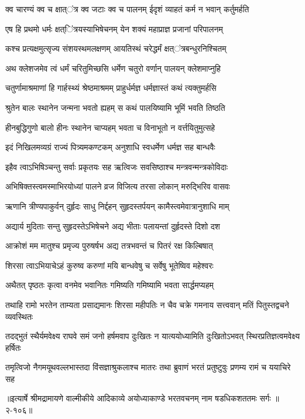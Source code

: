 \twolineshloka
{क्व चारण्यं क्व च क्षात्ऺत्र क्व जटाः क्व च पालनम्}
{ईदृशं व्याहतं कर्म न भवान् कर्तुमर्हति} %

\twolineshloka
{एष हि प्रथमो धर्मः क्षत्ऺित्रयस्याभिषेचनम्}
{येन शक्यं महाप्राज्ञ प्रजानां परिपालनम्} %

\twolineshloka
{कश्च प्रत्यक्षमुत्सृज्य संशयस्थमलक्षणम्}
{आयतिस्थं चरेद्धर्मं क्षत्ऺत्रबन्धुरनिश्चितम्} %

\twolineshloka
{अथ क्लेशजमेव त्वं धर्मं चरितुमिच्छसि}
{धर्मेण चतुरो वर्णान् पालयन् क्लेशमाप्नुहि} %

\twolineshloka
{चतुर्णामाश्रमाणां हि गार्हस्थ्यं श्रेष्ठमाश्रमम्}
{प्राहुर्धर्मज्ञ धर्मज्ञास्तं कथं त्यक्तुमर्हसि} %

\twolineshloka
{श्रुतेन बालः स्थानेन जन्मना भवतो ह्यहम्}
{स कथं पालयिष्यामि भूमिं भवति तिष्ठति} %

\twolineshloka
{हीनबुद्धिगुणो बालो हीनः स्थानेन चाप्यहम्}
{भवता च विनाभूतो न वर्त्तयितुमुत्सहे} %

\twolineshloka
{इदं निखिलमव्यग्रं राज्यं पित्र्यमकण्टकम्}
{अनुशाधि स्वधर्मेण धर्मज्ञ सह बान्धवैः} %

\twolineshloka
{इहैव त्वाऽभिषिञ्चन्तु सर्वाः प्रकृतयः सह}
{ऋत्विजः सवसिष्ठाश्च मन्त्रवन्मन्त्रकोविदाः} %

\twolineshloka
{अभिषिक्तस्त्वमस्माभिरयोध्यां पालने व्रज}
{विजित्य तरसा लोकान् मरुद्भिरिव वासवः} %

\twolineshloka
{ऋणानि त्रीण्यपाकुर्वन् दुर्हृदः साधु निर्द्दहन्}
{सुहृदस्तर्पयन् कामैस्त्वमेवात्रानुशाधि माम्} %

\twolineshloka
{अद्यार्य मुदिताः सन्तु सुहृदस्तेऽभिषेचने}
{अद्य भीताः पलायन्तां दुर्हृदस्ते दिशो दश} %

\twolineshloka
{आक्रोशं मम मातुश्च प्रमृज्य पुरुषर्षभ}
{अद्य तत्रभवन्तं च पितरं रक्ष किल्बिषात्} %

\twolineshloka
{शिरसा त्वाऽभियाचेऽहं कुरुष्व करुणां मयि}
{बान्धवेषु च सर्वेषु भूतेष्विव महेश्वरः} %

\twolineshloka
{अथैतत् पृष्ठतः कृत्वा वनमेव भवानितः}
{गमिष्यति गमिष्यामि भवता सार्द्धमप्यहम्} %

\twolineshloka
{तथाहि रामो भरतेन ताम्यता प्रसाद्यमानः शिरसा महीपतिः}
{न चैव चक्रे गमनाय सत्त्ववान् मतिं पितुस्तद्वचने व्यवस्थितः} %

\twolineshloka
{तदद्भुतं स्थैर्यमवेक्ष्य राघवे समं जनो हर्षमवाप दुःखितः}
{न यात्ययोध्यामिति दुःखितोऽभवत् स्थिरप्रतिज्ञत्वमवेक्ष्य हर्षितः} %

\twolineshloka
{तमृत्विजो नैगमयूथवल्लभास्तदा विंसज्ञाश्रुकलाश्च मातरः}
{तथा ब्रुवाणं भरतं प्रतुष्टुवुः प्रणम्य रामं च ययाचिरे सह} %


॥इत्यार्षे श्रीमद्रामायणे वाल्मीकीये आदिकाव्ये अयोध्याकाण्डे भरतवचनम् नाम षडधिकशततमः सर्गः ॥२-१०६॥
